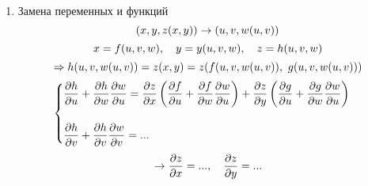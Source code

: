 \documentclass[main]{subfiles}
\begin{document}
\begin{enumerate}
        \item Замена переменных и функций
        \[(x,y, z(x,y)) \rightarrow (u,v, w(u,v))\]
        \[x = f(u,v,w),\quad y=y(u,v,w),\quad z = h(u,v,w)\]
        \[\Ra h(u,v,w(u,v)) = z(x,y) = z(f(u,v,w(u,v)),\ g(u,v,w(u,v)))\]
        \[\begin{cases}
            \dfrac{\partial h}{\partial u} + \dfrac{\partial h}{\partial w} \dfrac{\partial w}{\partial u} = \dfrac{\partial z}{\partial x} \left(\dfrac{\partial f}{\partial u} + \dfrac{\partial f}{\partial w} \dfrac{\partial w}{\partial u}\right) + \dfrac{\partial z}{\partial y} \left(\dfrac{\partial g}{\partial u} + \dfrac{\partial g}{\partial w} \dfrac{\partial w}{\partial u}\right)\\ \\
            \dfrac{\partial h}{\partial v} + \dfrac{\partial h}{\partial v} \dfrac{\partial w}{\partial v} = ...
        \end{cases}\]
        \[\rightarrow \dfrac{\partial z}{\partial x} = ...,\quad \dfrac{\partial z}{\partial y} = ...\]


\end{enumerate}
\end{document}
